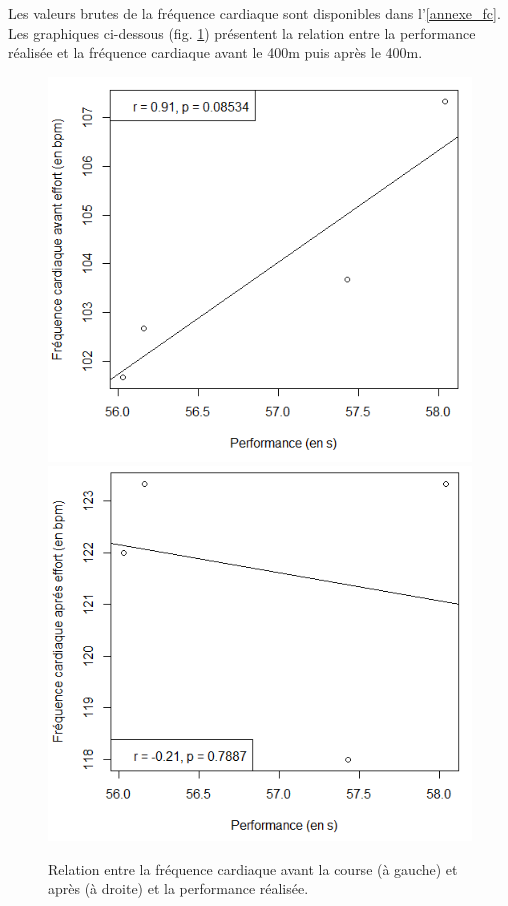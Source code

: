         Les valeurs brutes de la fréquence cardiaque sont disponibles dans l'\autoref{annexe_fc}.\\
         
        Les graphiques ci-dessous (fig. \ref{fig:fc_perf_moy_seule}) présentent la relation entre la performance réalisée et la fréquence cardiaque avant le 400m puis après le 400m.\\ 
         
         \begin{figure}[H]
                \centering
                \includegraphics[scale=0.6]{images/fc_perf_av_moy_seule}
                \hfill
                \includegraphics[scale=0.6]{images/fc_perf_ap_moy_seule}
                \caption{\label{fig:fc_perf_moy_seule}Relation entre la fréquence cardiaque avant la course (à gauche) et après (à droite) et la performance réalisée.}
            \end{figure}
            
